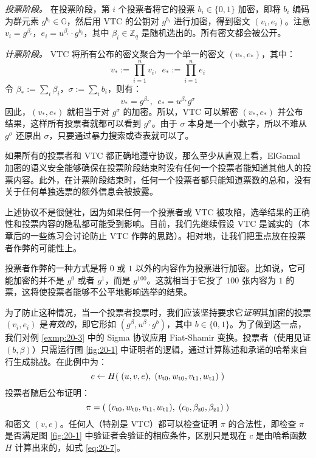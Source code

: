 \emph{投票阶段。}
在投票阶段，第 $i$ 个投票者将它的投票 $b_i\in\{0,1\}$ 加密，即将 $b_i$ 编码为群元素 $g^{b_i}\in\mathbb{G}$，然后用 VTC 的公钥对 $g^{b_i}$ 进行加密，得到密文 $(v_i,e_i)$。注意 $v_i=g^{\beta_i}$，$e_i=u^{\beta_i}\cdot g^{b_i}$，其中 $\beta_i\in\mathbb{Z}_q$ 是随机选出的。所有密文都会被公开。

\emph{计票阶段。}
VTC 将所有公布的密文聚合为一个单一的密文 $(v_*,e_*)$，其中：    
$$
v_*:=\prod_{i=1}^nv_i,~~
e_*:=\prod_{i=1}^ne_i
$$
令 $\beta_*:=\sum_i\beta_i$，$\sigma:=\sum_ib_i$，则有：
$$
v_*=g^{\beta_*},~~
e_*=u^{\beta_*}g^\sigma
$$
因此，$(v_*,e_*)$ 就相当于对 $g^\sigma$ 的加密。所以，VTC 可以解密 $(v_*,e_*)$ 并公布结果，这样所有投票者就都可以看到 $g^\sigma$。由于 $\sigma$ 本身是一个小数字，所以不难从 $g^\sigma$ 还原出 $\sigma$，只要通过暴力搜索或查表就可以了。

如果所有的投票者和 VTC 都正确地遵守协议，那么至少从直观上看，ElGamal 加密的语义安全能够确保在投票阶段结束时没有任何一个投票者能知道其他人的投票内容。此外，在计票阶段结束时，任何一个投票者都只能知道票数的总和，没有关于任何单独选票的额外信息会被披露。

上述协议不是很健壮，因为如果任何一个投票者或 VTC 被攻陷，选举结果的正确性和投票内容的隐私都可能受到影响。目前，我们先继续假设 VTC 是诚实的（本章后的一些练习会讨论防止 VTC 作弊的思路）。相对地，让我们把重点放在投票者作弊的可能性上。

投票者作弊的一种方式是将 $0$ 或 $1$ 以外的内容作为投票进行加密。比如说，它可能加密的并不是 $g^0$ 或者 $g^1$，而是 $g^{100}$。这就相当于它投了 $100$ 张内容为 $1$ 的票，这将使投票者能够不公平地影响选举的结果。

为了防止这种情况，当一个投票者投票时，我们应该坚持要求它\emph{证明}其加密的投票 $(v_i,e_i)$ 是\emph{有效的}，即它形如 $(g^\beta,u^\beta\cdot g^b)$，其中 $b\in\{0,1\}$。为了做到这一点，我们对例 \ref{exmp:20-3} 中的 Sigma 协议应用 Fiat-Shamir 变换。投票者（使用见证 $(b,\beta)$）只需运行图 \ref{fig:20-1} 中证明者的逻辑，通过计算陈述和承诺的哈希来自行生成挑战。在此例中为：
\begin{equation}\label{eq:20-7}
c\leftarrow H(\;(u,v,e),\;(v_{\rm t0},w_{\rm t0},v_{\rm t1},w_{\rm t1})\;)
\end{equation}
投票者随后公布证明：
\begin{equation}\label{eq:20-8}
\pi=(\;(v_{\rm t0},w_{\rm t0},v_{\rm t1},w_{\rm t1}),\;(c_0,\beta_{\rm z0},\beta_{\rm z1})\;)
\end{equation}
和密文 $(v,e)$。任何人（特别是 VTC）都可以检查证明 $\pi$ 的合法性，即检查 $\pi$ 是否满足图 \ref{fig:20-1} 中验证者会验证的相应条件，区别只是现在 $c$ 是由哈希函数 $H$ 计算出来的，如式 \ref{eq:20-7}。

